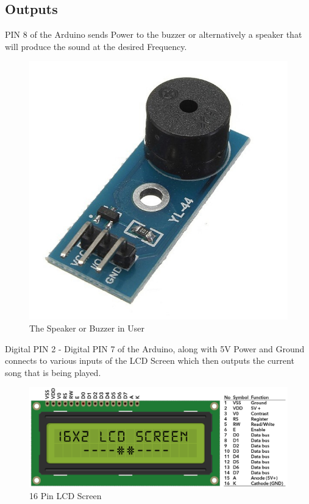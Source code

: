 \documentclass[11pt]{article}
\begin{document}
\subsection{Outputs}
PIN 8 of the Arduino sends Power to the buzzer or alternatively a speaker that will produce the sound at the desired Frequency.

\begin{figure}[H]
	\centering
	\includegraphics[scale=.2]{buzzer.jpg}
	\caption{The Speaker or Buzzer in User}
	\label{fig:buzzer pic}
\end{figure}

Digital PIN 2 - Digital PIN 7 of the Arduino, along with 5V Power and Ground connects to various inputs of the LCD Screen which then outputs the current song that is being played. 

\begin{figure}[H]
	\centering
	\includegraphics[scale=.45]{LCD.png}
	\caption{16 Pin LCD Screen}
	\label{fig:lcd pic}
\end{figure}
\end{document}

